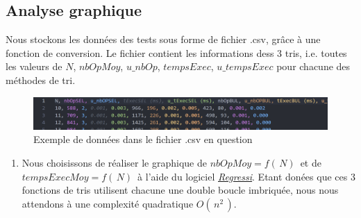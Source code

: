 \documentclass{report}
\begin{document}
\subsection{Analyse graphique}

\qquad Nous stockons les données des tests sous forme de fichier .csv, grâce à une fonction de conversion. Le fichier contient les informations dess 3 tris, i.e. toutes les valeurs de $N$, $nbOpMoy$, $u\_nbOp$, $tempsExec$, $u\_tempsExec$ pour chacune des méthodes de tri. 

\begin{figure}[H]
	\includegraphics[width=\textwidth]{../graphe/csvEx.png}
	\caption{Exemple de données dans le fichier .csv en question}
\end{figure}

\begin{enumerate}
	\item[\fcolorbox{black}{black}{\textbf{\textcolor{white}{3}}}] 
	Nous choisissons de réaliser le graphique de $nbOpMoy=f(\,N)\,$ et de $tempsExecMoy=f(\,N)\,$ à l'aide du logiciel \href{https://regressi.fr/WordPress/}{\it \underline{Regressi}}. Etant donées que ces 3 fonctions de tris utilisent chacune une double boucle imbriquée, nous nous attendons à une complexité quadratique $O(\,n^2\,)$.
\end{enumerate}
\end{document}
